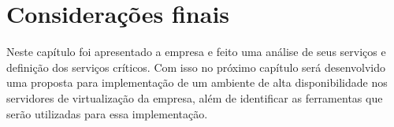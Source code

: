 
\section{Considerações finais}

Neste capítulo foi apresentado a empresa e feito uma análise de seus serviços e definição dos serviços críticos. Com isso no próximo capítulo 
será desenvolvido uma proposta para implementação de um ambiente de alta disponibilidade nos servidores de virtualização da empresa, além de 
identificar as ferramentas que serão utilizadas para essa implementação.



